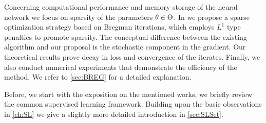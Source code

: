 Concerning computational performance and memory storage of the neural network we focus on sparsity of the parameters $\theta\in\Theta$. In \cite{bungert2022bregman} we propose a sparse optimization strategy based on Bregman iterations, which employs $L^1$ type penalties to promote sparsity. The conceptual difference between the existing algorithm and our proposal is the stochastic component in the gradient. Our theoretical results prove decay in loss and convergence of the iterates. Finally, we also conduct numerical experiments that demonstrate the efficiency of the method. We refer to \cref{sec:BREG} for a detailed explanation.

Before, we start with the exposition on the mentioned works, we briefly review the common supervised learning framework. Building upon the basic observations in \cref{ch:SL} we give a slightly more detailed introduction in \cref{sec:SLSet}.






